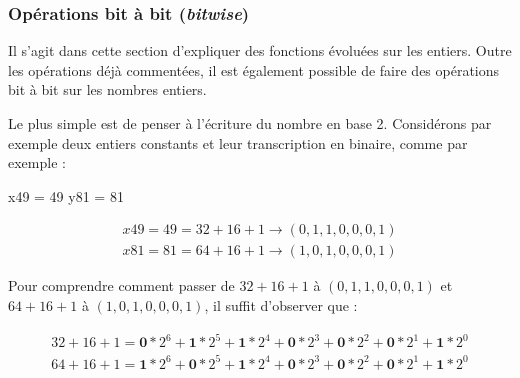 \subsubsection[Opérations bit à bit (\textit{bitwise})]{Opérations bit à bit (\textit{bitwise})}
\label{subsub:X.3.2.2}

Il s'agit dans cette section d'expliquer des fonctions évoluées sur les entiers. 
Outre les opérations déjà commentées, il est également possible de faire des opérations bit à bit sur les nombres entiers. 

Le plus simple est de penser à l'écriture du nombre en base 2.
Considérons par exemple deux entiers constants et leur transcription en binaire, comme par exemple :

\begin{idleconsole}[after skip=6pt]
	\begin{pyconsole}
		x49 = 49
		y81 = 81
	\end{pyconsole}
\end{idleconsole}

\begin{equation}
\begin{aligned}
x49 = 49 = 32 + 16 + 1 \rightarrow (0, 1, 1, 0, 0, 0, 1) \\
x81 = 81 = 64 + 16 + 1 \rightarrow (1, 0, 1, 0, 0, 0, 1)
\end{aligned}
\end{equation}

Pour comprendre comment passer de $32 + 16 + 1$ à $(0, 1, 1, 0, 0, 0, 1)$ et $64 + 16 + 1$ à $(1, 0, 1, 0, 0, 0, 1)$, il suffit d'observer que :

\vspace{-\baselineskip}
\begin{equation}
\begin{aligned}
32 + 16 + 1 = \mathbf{0}*2^6 + \mathbf{1}*2^5 + \mathbf{1}*2^4 + \mathbf{0}*2^3 + \mathbf{0}*2^2 + \mathbf{0}*2^1 +\mathbf{1}*2^0 \\
64 + 16 + 1 = \mathbf{1}*2^6 + \mathbf{0}*2^5 + \mathbf{1}*2^4 + \mathbf{0}*2^3 + \mathbf{0}*2^2 + \mathbf{0}*2^1 + \mathbf{1}*2^0 
\end{aligned}
\end{equation}



